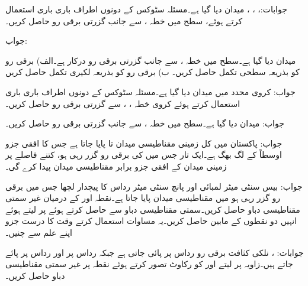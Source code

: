 جوابات:، ، ، 
میدان  دیا گیا ہے۔مسئلہ سٹوکس کے دونوں اطراف باری باری استعمال کرتے ہوئے،  سطح  میں خطہ ،  سے  جانب گزرتی برقی رو حاصل کریں۔

جواب:

میدان  دیا گیا ہے۔سطح  میں خطہ ،  سے  جانب گزرتی برقی رو درکار ہے۔الف) برقی رو کو بذریعہ سطحی تکمل حاصل کریں۔ ب) برقی رو کو بذریعہ لکیری تکمل حاصل کریں

جواب:
کروی محدد میں میدان  دیا گیا ہے۔مسئلہ سٹوکس کے دونوں اطراف باری باری استعمال کرتے ہوئے کروی خطہ ، ،  سے گزرتی برقی رو حاصل کریں۔

جواب:
میدان  دیا گیا ہے۔سطح  میں خطہ ،  سے  جانب گزرتی برقی رو حاصل کریں۔ 

جواب:
پاکستان میں کل زمینی مقناطیسی میدان  تا  پایا جاتا ہے جس کا افقی جزو اوسطاً  کے لگ بھگ ہے۔ایک تار جس میں  کی برقی رو گزر رہی ہو، کتنے فاصلے پر زمینی میدان کے افقی جزو برابر مقناطیسی میدان پیدا کرے گی۔

جواب: 
بیس سنٹی میٹر لمبائی اور پانچ سنٹی میٹر رداس کا پیچدار لچھا جس میں برقی رو گزر رہی ہو میں مقناطیسی میدان  پایا جاتا ہے۔نقطہ  اور  کے درمیان غیر سمتی مقناطیسی دباو  حاصل کریں۔سمتی مقناطیسی دباو  سے حاصل کرتے ہوئے  پر  لیتے ہوئے انہیں دو نقطوں کے مابین  حاصل کریں۔یہ مساوات استعمال کرتے وقت  کا درست جزو اپنے علم سے چنیں۔

جوابات: ، 
نلکی کثافت برقی رو  رداس  پر پائی جاتی ہے جبکہ رداس  پر  اور رداس  پر  پائے جاتے ہیں۔زاویہ  پر  لیتے اور  کو رکاوٹ تصور کرتے ہوئے  نقطہ   پر غیر سمتی مقناطیسی دباو  حاصل کریں۔

